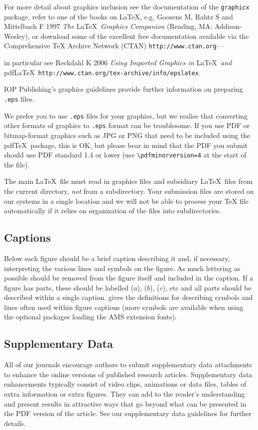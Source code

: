 \documentclass[12pt]{iopart}
\begin{document}
For more detail about graphics inclusion see the documentation 
of the \verb"graphicx" package, refer to one of the books on \LaTeX , e.g. Goosens M, Rahtz S and Mittelbach F 1997 {\it The }\LaTeX\ {\it Graphics Companion\/} 
(Reading, MA: Addison-Wesley),
or download some of the excellent free documentation available via the Comprehensive
TeX Archive Network (CTAN) \verb"http://www.ctan.org"---{in particular see Reckdahl K 2006 {\it Using Imported Graphics in }\LaTeX\ {\it and }pdf\LaTeX\ \verb"http://www.ctan.org/tex-archive/info/epslatex".

IOP Publishing's graphics guidelines provide further information on preparing \verb".eps" files.

We prefer you to use \verb".eps" files for your graphics, but we realise that converting other
formats of graphics to \verb".eps" format can be troublesome.  If you use PDF or bitmap-format graphics
such as JPG or PNG that need to be included using the pdf\TeX\ package, this is OK, but please bear
in mind that the PDF you submit should use PDF standard 1.4 or lower (use \verb"\pdfminorversion=4" at the
start of the file).

The main \LaTeX\ file must read in graphics files and subsidiary \LaTeX\ files from the current directory,
{\it not} from a subdirectory.  Your submission files are stored on our systems in a single location and we will not be able to process your
TeX file automatically if it relies on organization of the files into subdirectories.

\subsection{Captions}
Below each figure should be a brief caption describing it and, if 
necessary, interpreting the various lines and symbols on the figure. 
As much lettering as possible should be removed from the figure itself 
and included in the caption. If a figure has parts, these should be 
labelled ($a$), ($b$), ($c$), etc and all parts should be described 
within a single caption.  gives the definitions for describing 
symbols and lines often used within figure captions (more symbols are 
available when using the optional packages loading the AMS extension fonts).

\subsection{Supplementary Data}
All of our journals encourage authors to submit supplementary data attachments to 
enhance the online versions of published research articles. Supplementary data 
enhancements typically consist of video clips, animations or
data files, tables of extra information or extra figures. They can 
add to the reader's understanding and present results in attractive ways that go 
beyond what can be presented in the PDF version of the article. 
See our supplementary data guidelines for further details.

}
\end{document}
